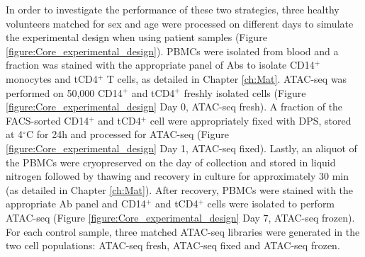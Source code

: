 In order to investigate the performance of these two strategies, three healthy volunteers  matched for sex and age were processed on different days to simulate the experimental design when using patient samples (Figure \ref{figure:Core_experimental_design}). PBMCs were isolated from blood and a fraction was stained with the appropriate panel of Abs to isolate CD14$^+$ monocytes and tCD4$^+$ T cells, as detailed in Chapter \ref{ch:Mat}. ATAC-seq was performed on 50,000 CD14$^+$ and tCD4$^+$ freshly isolated cells (Figure \ref{figure:Core_experimental_design} Day 0, ATAC-seq fresh). A fraction of the FACS-sorted CD14$^+$ and tCD4$^+$ cell were appropriately fixed with DPS, stored at 4{$^\circ$}C for 24h and processed for ATAC-seq (Figure \ref{figure:Core_experimental_design} Day 1, ATAC-seq fixed). Lastly, an aliquot of the PBMCs were cryopreserved on the day of collection and stored in liquid nitrogen followed by thawing and recovery in culture for approximately 30 min (as detailed in Chapter \ref{ch:Mat}). After recovery, PBMCs were stained with the appropriate Ab panel and CD14$^+$ and tCD4$^+$ cells were isolated to perform ATAC-seq (Figure \ref{figure:Core_experimental_design} Day 7, ATAC-seq frozen). For each control sample, three matched ATAC-seq libraries were generated in the two cell populations: ATAC-seq fresh, ATAC-seq fixed and ATAC-seq frozen.

